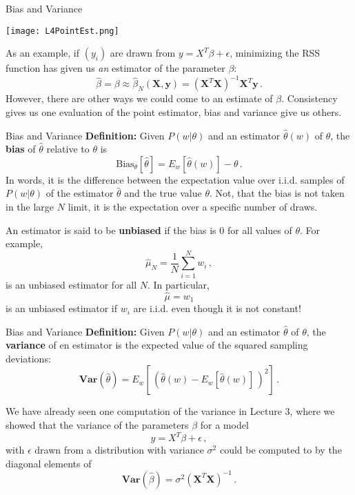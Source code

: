 \documentclass[10pt, table, dvipsnames,xcdraw,handout]{beamer}
\begin{document}
\begin{frame}[fragile]{Bias and Variance} 
  \begin{minipage}[t][0.5\textheight][t]{\textwidth}
	\centering \texttt{[image: L4PointEst.png]} 
  \end{minipage}
  \vfill
\begin{minipage}[t][0.5\textheight][t]{\textwidth}
As an example, if $(y_i)$ are drawn from $y = X^T\beta + \epsilon$,  minimizing the RSS function has given us \emph{an} estimator of the parameter $\beta$:
$$
\hat{\beta} = \beta \approx \hat{\beta}_N(\mathbf{X},\mathbf{y}) = (\mathbf{X}^T\mathbf{X})^{-1}\mathbf{X}^T\mathbf{y}\,.
$$
However, there are other ways we could come to an estimate of $\beta$. Consistency gives us one evaluation of the point estimator, bias and variance give us others. 
\end{minipage}
\end{frame}



\begin{frame}[fragile]{Bias and Variance} 
\textbf{Definition:} Given $P(w|\theta)$ and an estimator $\hat{\theta}(w)$ of $\theta$, the \textbf{bias} of $\hat{\theta}$ relative to $\theta$ is
$$
\text{Bias}_\theta[\hat{\theta}] = E_{w}[\hat{\theta}(w)] - \theta\,.
$$ 
In words, it is the difference between the expectation value over i.i.d. samples of $P(w|\theta)$ of the estimator $\hat{\theta}$ and the true value $\theta$. Not, that the bias is not taken in the large $N$ limit, it is the expectation over a specific number of draws. \pause

An estimator is said to be \textbf{unbiased} if the bias is 0 for all values of $\theta$. For example, 
$$
\hat{\mu}_N = \frac{1}{N} \sum_{i=1}^N w_i\,,
$$
is an unbiased estimator for all $N$. In particular, 
$$
\hat{\mu} = w_1
$$
is an unbiased estimator if $w_i$ are i.i.d. even though it is not constant!
\end{frame}





\begin{frame}[fragile]{Bias and Variance} 
\textbf{Definition:} Given $P(w|\theta)$ and an estimator $\hat{\theta}$ of $\theta$, the \textbf{variance} of en estimator is the expected value of the squared sampling deviations:
$$
\textbf{Var}(\hat{\theta}) = E_{w}[\,(\hat{\theta}(w) -E_{w}[\hat{\theta}(w)]\,)^2 ]\,.
$$\pause

We have already seen one computation of the variance in Lecture 3, where we showed that the variance of the parameters $\beta$ for a model 
$$
y = X^T\beta + \epsilon\,,
$$
with $\epsilon$ drawn from a distribution with variance $\sigma^2$ could be computed to by the diagonal elements of
$$
\textbf{Var}(\hat{\beta}) = \sigma^2(\mathbf{X}^T\mathbf{X})^{-1}\,.
$$
\end{frame}
\end{document}
